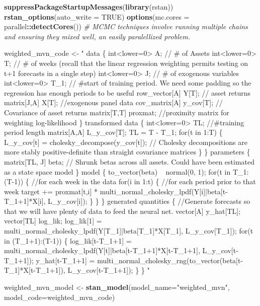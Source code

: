 \documentclass[]{article}
\newenvironment{Shaded}{\begin{snugshade}}{\end{snugshade}}
\newcommand{\KeywordTok}[1]{\textcolor[rgb]{0.13,0.29,0.53}{\textbf{#1}}}
\newcommand{\DataTypeTok}[1]{\textcolor[rgb]{0.13,0.29,0.53}{#1}}
\newcommand{\StringTok}[1]{\textcolor[rgb]{0.31,0.60,0.02}{#1}}
\newcommand{\CommentTok}[1]{\textcolor[rgb]{0.56,0.35,0.01}{\textit{#1}}}
\newcommand{\OtherTok}[1]{\textcolor[rgb]{0.56,0.35,0.01}{#1}}
\newcommand{\OperatorTok}[1]{\textcolor[rgb]{0.81,0.36,0.00}{\textbf{#1}}}
\newcommand{\NormalTok}[1]{#1}
\begin{document}
\begin{Shaded}
\begin{Highlighting}[]
\KeywordTok{suppressPackageStartupMessages}\NormalTok{(}\KeywordTok{library}\NormalTok{(rstan))}
\KeywordTok{rstan_options}\NormalTok{(}\DataTypeTok{auto_write =} \OtherTok{TRUE}\NormalTok{)}
\KeywordTok{options}\NormalTok{(}\DataTypeTok{mc.cores =}\NormalTok{ parallel}\OperatorTok{::}\KeywordTok{detectCores}\NormalTok{()) }\CommentTok{# MCMC techniques involve running multiple chains and ensuring they mixed well, an easily paralellized problem.}

\NormalTok{weighted_mvn_code <-}\StringTok{ "}
\StringTok{data \{}
\StringTok{  int<lower=0> A; // # of Assets}
\StringTok{  int<lower=0> T; // # of weeks (recall that the linear regression weighting permits testing on t+1 forecasts in a single step)}
\StringTok{  int<lower=0> J; // # of exogenous variables}
\StringTok{  int<lower=0> T_1; // #start of training period. We need some padding so the regression has enough periods to be useful }
\StringTok{  }
\StringTok{  row_vector[A] Y[T]; // asset returns}
\StringTok{  matrix[J,A] X[T]; //exogenous panel data}
\StringTok{  cov_matrix[A] y_cov[T]; // Covariance of asset returns}
\StringTok{  matrix[T,T] proxmat; //proximity matrix for weighting log-likelihood}
\StringTok{\}}
\StringTok{transformed data \{}
\StringTok{  int<lower=0> TL; //#training period length}
\StringTok{  matrix[A,A] L_y_cov[T];}
\StringTok{  TL = T - T_1;}
\StringTok{  for(t in 1:T) \{}
\StringTok{    L_y_cov[t] = cholesky_decompose(y_cov[t]); // Cholesky decompositions are more stably positive-definite than straight covariance matrices}
\StringTok{  \}}
\StringTok{\}}
\StringTok{parameters \{}
\StringTok{  matrix[TL, J] beta; // Shrunk betas across all assets. Could have been estimated as a state space model}
\StringTok{\}}
\StringTok{model \{}
\StringTok{  to_vector(beta) ~ normal(0, 1);}
\StringTok{  for(t in T_1:(T-1)) \{ //for each week in the data}
\StringTok{      for(i in 1:t) \{ //for each period prior to that week}
\StringTok{        target += proxmat[t,i] * multi_normal_cholesky_lpdf(Y[i]|beta[t-T_1+1]*X[i], L_y_cov[i]);}
\StringTok{      \}}
\StringTok{    \}}
\StringTok{\}}
\StringTok{generated quantities \{}
\StringTok{  //Generate forecasts so that we will have plenty of data to feed the neural net.}
\StringTok{  vector[A] y_hat[TL];}
\StringTok{  vector[TL] log_lik;}
\StringTok{  log_lik[1] = multi_normal_cholesky_lpdf(Y[T_1]|beta[T_1]*X[T_1], L_y_cov[T_1]);}
\StringTok{  for(t in (T_1+1):(T-1)) \{}
\StringTok{    log_lik[t-T_1+1] = multi_normal_cholesky_lpdf(Y[t]|beta[t-T_1+1]*X[t-T_1+1], L_y_cov[t-T_1+1]);}
\StringTok{    y_hat[t-T_1+1] = multi_normal_cholesky_rng(to_vector(beta[t-T_1]*X[t-T_1+1]), L_y_cov[t-T_1+1]);}
\StringTok{  \} }
\StringTok{\}}
\StringTok{"}

\NormalTok{weighted_mvn_model <-}\StringTok{ }\KeywordTok{stan_model}\NormalTok{(}\DataTypeTok{model_name=}\StringTok{"weighted_mvn"}\NormalTok{, }\DataTypeTok{model_code=}\NormalTok{weighted_mvn_code)}
\end{Highlighting}
\end{Shaded}
\end{document}

